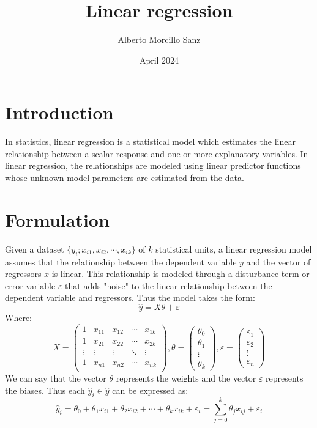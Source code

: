 \documentclass{article}
\title{Linear regression}
\author{Alberto Morcillo Sanz}
\date{April 2024}
\begin{document}
\maketitle

\section{Introduction}
In statistics, \href{https://en.wikipedia.org/wiki/Linear_regression}{linear regression} is a statistical model which estimates the linear relationship between a scalar response and one or more explanatory variables.
In linear regression, the relationships are modeled using linear predictor functions whose unknown model parameters are estimated from the data.

\section{Formulation}
Given a dataset $\{y_i; x_{i1}, x_{i2}, \cdots, x_{ik}\}$ of $k$ statistical units, a linear regression model assumes that the relationship between the dependent variable $y$ and the vector of regressors $x$ is linear. This relationship is modeled through a disturbance term or error variable $\varepsilon$ that adds "noise" to the linear relationship between the dependent variable and regressors. Thus the model takes the form:
$$\hat{y} = X\theta + \varepsilon$$
Where: 
$$
X = \begin{pmatrix}
1 & x_{11} & x_{12} & \cdots & x_{1k} \\ 
1 & x_{21} & x_{22} & \cdots & x_{2k} \\ 
\vdots & \vdots & \vdots & \ddots  & \vdots \\ 
1 & x_{n1} & x_{n2} & \cdots & x_{nk} \\ 
\end{pmatrix}, \theta = 
\begin{pmatrix}
\theta_0\\ 
\theta_1\\ 
\vdots\\ 
\theta_k
\end{pmatrix}, \varepsilon = 
\begin{pmatrix}
\varepsilon_1\\ 
\varepsilon_2\\ 
\vdots\\ 
\varepsilon_n
\end{pmatrix}
$$
We can say that the vector $\theta$ represents the weights and the vector $\varepsilon$ represents the biases. Thus each $\hat{y}_i \in \hat{y}$ can be expressed as:
$$\hat{y}_i = \theta_0 + \theta_1 x_{i1} + \theta_2 x_{i2} + \cdots + \theta_k x_{ik} + \varepsilon_i = \sum^{k}_{j=0}\theta_j x_{ij} + \varepsilon_i$$
\end{document}
